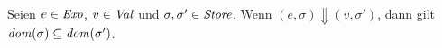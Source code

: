 \documentclass[12pt,a4paper,bigheadings]{scrartcl}
\newcommand{\grph}[1]{\name{graph}(#1)}
\newcommand{\RN}[1]{\mbox{{\sc (#1)}}}
\begin{document}
%
%
%
%
%

\begin{lemma} \label{lemma:Stores_und_big_steps}
  Seien $e\in{\text{\it Exp\/}}$, $v\in{\text{\it Val\/}}$ und $\sigma,\sigma'\in{\text{\it Store\/}}$. Wenn
  $(e,\sigma) \Downarrow (v,\sigma')$, dann gilt ${\text{\it dom\/}}(\sigma) \subseteq {\text{\it dom\/}}(\sigma')$.
\end{lemma}
\end{document}
